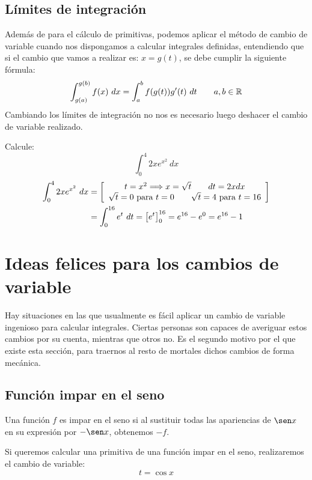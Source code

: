 \subsection{Límites de integración}
Además de para el cálculo de primitivas, podemos aplicar el método de cambio de variable cuando nos dispongamos a calcular integrales definidas, entendiendo que si el cambio que vamos a realizar es: $x = g(t)$, se debe cumplir la siguiente fórmula:
\begin{equation*}
    \displaystyle\int_{g(a)}^{g(b)} f(x)~dx  = \displaystyle\int_{a}^{b} f(g(t))g'(t)~dt  \qquad a,b\in \mathbb{R}
\end{equation*}
Cambiando los límites de integración no nos es necesario luego deshacer el cambio de variable realizado.
\begin{ejemplo}
    Calcule:
    \begin{equation*}
        \displaystyle\int_{0}^{4} 2xe^{x^2}~dx 
    \end{equation*}
    \begin{align*}
        \displaystyle\int_{0}^{4} 2xe^{x^2}~dx &= \left[\begin{array}{c} t=x^2\Longrightarrow x=\sqrt{t}\qquad   dt = 2xdx \\ \sqrt{t}=0\text{\ para\ }t=0\qquad \sqrt{t}=4\text{\ para\ }t=16 \end{array}\right] \\
                                               &= \displaystyle\int_{0}^{16} e^t~dt  = {\left[e^t\right]}_0^{16} = e^{16} - e^0 = e^{16}- 1
    \end{align*}

\end{ejemplo}

\section{Ideas felices para los cambios de variable}
Hay situaciones en las que usualmente es fácil aplicar un cambio de variable ingenioso para calcular integrales. Ciertas personas son capaces de averiguar estos cambios por su cuenta, mientras que otros no. Es el segundo motivo por el que existe esta sección, para traernos al resto de mortales dichos cambios de forma mecánica.

\subsection{Función impar en el seno}
\begin{definicion}
    Una función $f$ es impar en el seno si al sustituir todas las apariencias de $\sen x$ en su expresión por $-\sen x$, obtenemos $-f$.
\end{definicion}
Si queremos calcular una primitiva de una función impar en el seno, realizaremos el cambio de variable:
\begin{equation*}
    t = \cos x
\end{equation*}

